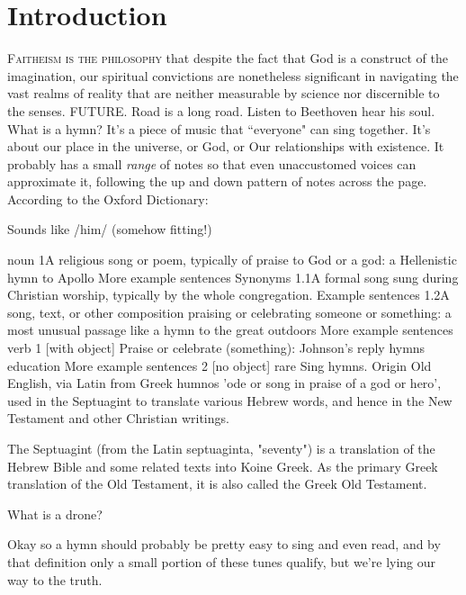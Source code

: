\documentclass[a5paper,twoside,9pt]{extbook}
\newtheorem{I Surrender}{Definition}
\begin{document}
\tableofcontents
\chapter{Introduction}

\lettrine{F}{aitheism is the philosophy} that despite the fact that God is a construct of the imagination, our spiritual convictions are nonetheless significant in navigating the vast realms of reality that are neither measurable by science nor discernible to the senses.
FUTURE.
Road is a long road.
Listen to Beethoven hear his soul.
What is a hymn? It's a piece of music that ``everyone" can sing together. It's about our place in the universe, or God, or Our relationships with existence. It probably has a small \emph{range} of notes so that even unaccustomed voices can approximate it, following the up and down pattern of notes across the page. According to the Oxford Dictionary:

Sounds like /him/ (somehow fitting!)

noun
1A religious song or poem, typically of praise to God or a god: a Hellenistic hymn to Apollo
More example sentences Synonyms
1.1A formal song sung during Christian worship, typically by the whole congregation.
Example sentences
1.2A song, text, or other composition praising or celebrating someone or something: a most unusual passage like a hymn to the great outdoors
More example sentences
verb
1 [with object] Praise or celebrate (something): Johnson’s reply hymns education
More example sentences
2 [no object] rare Sing hymns.
Origin
Old English, via Latin from Greek humnos 'ode or song in praise of a god or hero', used in the Septuagint to translate various Hebrew words, and hence in the New Testament and other Christian writings.

The Septuagint (from the Latin septuaginta, "seventy") is a translation of the Hebrew Bible and some related texts into Koine Greek. As the primary Greek translation of the Old Testament, it is also called the Greek Old Testament.

What is a drone?

Okay so a hymn should probably be pretty easy to sing and even read, and by that definition only a small portion of these tunes qualify, but we're lying our way to the truth.
\end{document}
